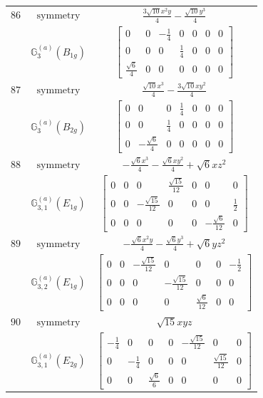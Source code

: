 \documentclass[fleqn,8pt,landscape]{jsarticle}
\begin{document}
\begin{longtable}{ccc}
$ 86 $ & $ \text{symmetry} $ & $ \frac{3 \sqrt{10} x^{2} y}{4} - \frac{\sqrt{10} y^{3}}{4} $ \\
$  $ & $ \mathbb{G}_{3}^{(a)}(B_{1g}) $ & $ \begin{bmatrix} 0 & 0 & - \frac{1}{4} & 0 & 0 & 0 & 0 \\ 0 & 0 & 0 & \frac{1}{4} & 0 & 0 & 0 \\ \frac{\sqrt{6}}{4} & 0 & 0 & 0 & 0 & 0 & 0 \end{bmatrix} $ \\ \hline
$ 87 $ & $ \text{symmetry} $ & $ \frac{\sqrt{10} x^{3}}{4} - \frac{3 \sqrt{10} x y^{2}}{4} $ \\
$  $ & $ \mathbb{G}_{3}^{(a)}(B_{2g}) $ & $ \begin{bmatrix} 0 & 0 & 0 & \frac{1}{4} & 0 & 0 & 0 \\ 0 & 0 & \frac{1}{4} & 0 & 0 & 0 & 0 \\ 0 & - \frac{\sqrt{6}}{4} & 0 & 0 & 0 & 0 & 0 \end{bmatrix} $ \\ \hline
$ 88 $ & $ \text{symmetry} $ & $ - \frac{\sqrt{6} x^{3}}{4} - \frac{\sqrt{6} x y^{2}}{4} + \sqrt{6} x z^{2} $ \\
$  $ & $ \mathbb{G}_{3,1}^{(a)}(E_{1g}) $ & $ \begin{bmatrix} 0 & 0 & 0 & \frac{\sqrt{15}}{12} & 0 & 0 & 0 \\ 0 & 0 & - \frac{\sqrt{15}}{12} & 0 & 0 & 0 & \frac{1}{2} \\ 0 & 0 & 0 & 0 & 0 & - \frac{\sqrt{6}}{12} & 0 \end{bmatrix} $ \\ \hline
$ 89 $ & $ \text{symmetry} $ & $ - \frac{\sqrt{6} x^{2} y}{4} - \frac{\sqrt{6} y^{3}}{4} + \sqrt{6} y z^{2} $ \\
$  $ & $ \mathbb{G}_{3,2}^{(a)}(E_{1g}) $ & $ \begin{bmatrix} 0 & 0 & - \frac{\sqrt{15}}{12} & 0 & 0 & 0 & - \frac{1}{2} \\ 0 & 0 & 0 & - \frac{\sqrt{15}}{12} & 0 & 0 & 0 \\ 0 & 0 & 0 & 0 & \frac{\sqrt{6}}{12} & 0 & 0 \end{bmatrix} $ \\ \hline
$ 90 $ & $ \text{symmetry} $ & $ \sqrt{15} x y z $ \\
$  $ & $ \mathbb{G}_{3,1}^{(a)}(E_{2g}) $ & $ \begin{bmatrix} - \frac{1}{4} & 0 & 0 & 0 & - \frac{\sqrt{15}}{12} & 0 & 0 \\ 0 & - \frac{1}{4} & 0 & 0 & 0 & \frac{\sqrt{15}}{12} & 0 \\ 0 & 0 & \frac{\sqrt{6}}{6} & 0 & 0 & 0 & 0 \end{bmatrix} $ \\ \hline

\end{longtable}
\end{document}
